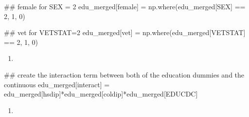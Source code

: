 \documentclass[
  letterpaper,
  DIV=11,
  numbers=noendperiod]{scrartcl}
\newenvironment{Shaded}{\begin{snugshade}}{\end{snugshade}}
\newcommand{\CommentTok}[1]{\textcolor[rgb]{0.37,0.37,0.37}{#1}}
\newcommand{\DecValTok}[1]{\textcolor[rgb]{0.68,0.00,0.00}{#1}}
\newcommand{\NormalTok}[1]{\textcolor[rgb]{0.00,0.23,0.31}{#1}}
\newcommand{\OperatorTok}[1]{\textcolor[rgb]{0.37,0.37,0.37}{#1}}
\newcommand{\StringTok}[1]{\textcolor[rgb]{0.13,0.47,0.30}{#1}}
\providecommand{\tightlist}{%
  \setlength{\itemsep}{0pt}\setlength{\parskip}{0pt}}\usepackage{longtable,booktabs,array}
\begin{document}
\begin{Shaded}
\begin{Highlighting}[]
\CommentTok{\#\# female for SEX = 2}
\NormalTok{edu\_merged[}\StringTok{\textquotesingle{}female\textquotesingle{}}\NormalTok{] }\OperatorTok{=}\NormalTok{ np.where(edu\_merged[}\StringTok{\textquotesingle{}SEX\textquotesingle{}}\NormalTok{] }\OperatorTok{==} \DecValTok{2}\NormalTok{, }\DecValTok{1}\NormalTok{, }\DecValTok{0}\NormalTok{)}

\CommentTok{\#\# vet for VETSTAT=2}
\NormalTok{edu\_merged[}\StringTok{\textquotesingle{}vet\textquotesingle{}}\NormalTok{] }\OperatorTok{=}\NormalTok{ np.where(edu\_merged[}\StringTok{\textquotesingle{}VETSTAT\textquotesingle{}}\NormalTok{] }\OperatorTok{==} \DecValTok{2}\NormalTok{, }\DecValTok{1}\NormalTok{, }\DecValTok{0}\NormalTok{)}
\end{Highlighting}
\end{Shaded}

\begin{enumerate}
\def\labelenumi{\alph{enumi}.}
\setcounter{enumi}{2}
\tightlist
\item
\end{enumerate}

\begin{Shaded}
\begin{Highlighting}[]
\CommentTok{\#\# create the interaction term between both of the education dummies and the continuous}
\NormalTok{edu\_merged[}\StringTok{\textquotesingle{}interact\textquotesingle{}}\NormalTok{] }\OperatorTok{=}\NormalTok{ edu\_merged[}\StringTok{\textquotesingle{}hsdip\textquotesingle{}}\NormalTok{]}\OperatorTok{*}\NormalTok{edu\_merged[}\StringTok{\textquotesingle{}coldip\textquotesingle{}}\NormalTok{]}\OperatorTok{*}\NormalTok{edu\_merged[}\StringTok{\textquotesingle{}EDUCDC\textquotesingle{}}\NormalTok{]}
\end{Highlighting}
\end{Shaded}

\begin{enumerate}
\def\labelenumi{\alph{enumi}.}
\setcounter{enumi}{3}
\tightlist
\item
\end{enumerate}
\end{document}

